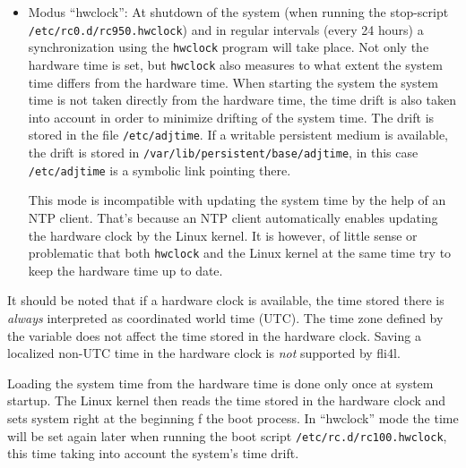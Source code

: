 \begin{description}
{\begin{itemize}
  This mode must also be used if no hardware clock at all exists. The Linux kernel
  will not keep hardware time up-to-date in this case simply because there is none. In
  order to have a realistic system time at all, the use of a NTP client should
  be mandatory.
   
  \item Modus ``hwclock'': At shutdown of the system (when running the stop-script\\
  \texttt{/etc/rc0.d/rc950.hwclock}) and in regular intervals (every 24 hours) a
  synchronization using the \texttt{hwclock} program will take place. Not only the
  hardware time is set, but \texttt{hwclock} also measures to what extent the system
  time differs from the hardware time. When starting the system the system time is 
  not taken directly from the hardware time, the time drift is also taken into account
  in order to minimize drifting of the system time. The drift is stored in the file
  \texttt{/etc/adjtime}. If a writable persistent medium is available, the drift is
  stored in \texttt{/var/lib/persistent/base/adjtime}, in this case \texttt{/etc/adjtime}
  is a symbolic link pointing there.
  
  This mode is incompatible with updating the system time by the help of an NTP client.
  That's because an NTP client automatically enables updating the hardware clock by
  the Linux kernel. It is however, of little sense or problematic that both \texttt{hwclock}
  and the Linux kernel at the same time try to keep the hardware time up to date.
  \end{itemize}
  
  It should be noted that if a hardware clock is available, the time stored there
  is \emph{always} interpreted as coordinated world time (UTC). The time zone
  defined by the variable  does not affect the time stored
  in the hardware clock. Saving a localized non-UTC time in the hardware clock
  is \emph{not} supported by fli4l.
  
  Loading the system time from the hardware time is done only once at system startup.
  The Linux kernel then reads the time stored in the hardware clock and sets system
  right at the beginning f the boot process. In ``hwclock'' mode the time will be
  set again later when running the boot script \texttt{/etc/rc.d/rc100.hwclock},
  this time taking into account the system's time drift.}



\end{description}
